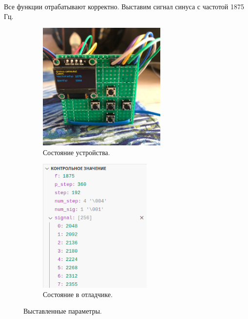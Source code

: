 	Все функции отрабатывают корректно. Выставим сигнал синуса с частотой 1875 Гц.
	
	\begin{figure}[H]\captionsetup[subfigure]{font=normalsize}
     \begin{subfigure}[H]{0.5\textwidth}
         \centering
         \includegraphics[width=0.7\textwidth]{../image/test4_u_f.jpg}
         \caption{Состояние устройства.}
    	\end{subfigure}
     \hfill
     \begin{subfigure}[H]{0.5\textwidth}
         \centering
         \includegraphics[width=0.62\textwidth]{../image/test4_o_f.png}
         \caption{Состояние в отладчике.}
     \end{subfigure}
        \caption{Выставленные параметры.}
	\end{figure}
	
